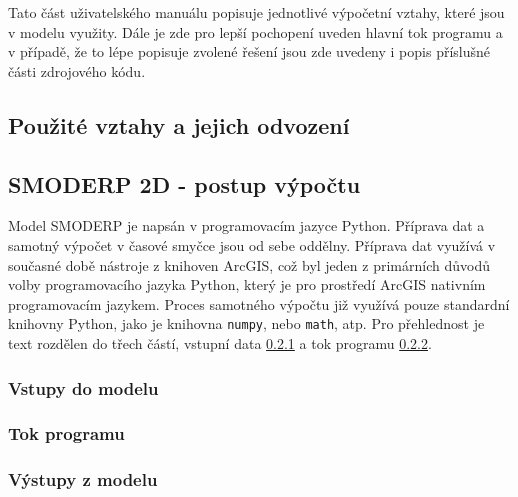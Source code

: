 %

Tato část uživatelského manuálu popisuje jednotlivé výpočetní vztahy, které jsou v modelu využity. Dále je zde pro lepší pochopení uveden hlavní tok programu a v případě, že to lépe popisuje zvolené řešení jsou zde uvedeny i popis příslušné části zdrojového kódu.


\subsection{Použité vztahy a jejich odvození} \label{modelovani}


  


\subsection{SMODERP 2D - postup výpočtu} \label{vypocet}

Model SMODERP je napsán v programovacím jazyce Python. Příprava dat a samotný výpočet v časové smyčce jsou od sebe oddělny. Příprava dat využívá v současné době nástroje z knihoven ArcGIS, což byl jeden z primárních důvodů volby  programovacího jazyka Python, který je pro prostředí ArcGIS nativním programovacím jazykem. Proces samotného výpočtu již využívá pouze standardní knihovny Python, jako je knihovna \texttt{numpy}, nebo \texttt{math}, atp. Pro přehlednost je text rozdělen do třech částí, vstupní data \ref{kap:vstupy} a tok programu \ref{kap:tok}. %

		
	
	\subsubsection{Vstupy do modelu} \label{kap:vstupy}
	 
	
	\subsubsection{Tok programu} \label{kap:tok}
	
	
	\subsubsection{Výstupy z modelu} \label{kap:vystupy}
	

